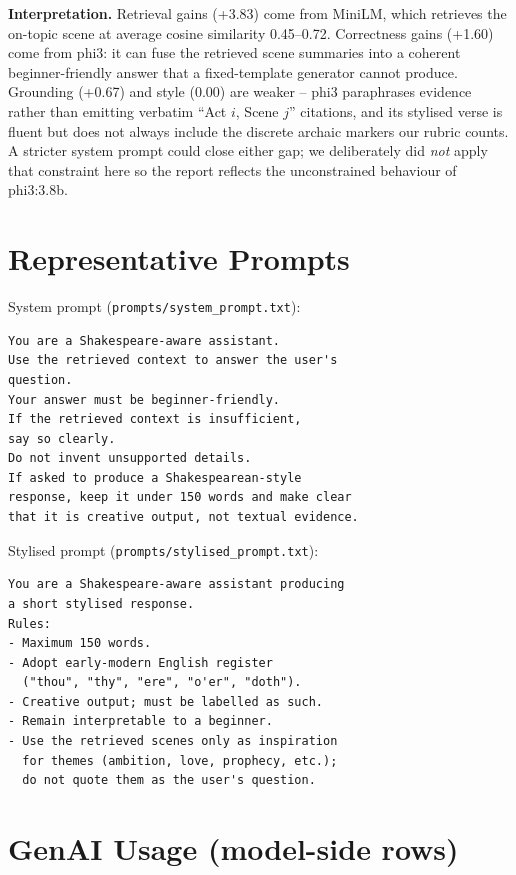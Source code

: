 \documentclass[10pt,twocolumn,a4paper]{article}
\begin{document}
\textbf{Interpretation.} Retrieval gains (+3.83) come from MiniLM,
which retrieves the on-topic scene at average cosine similarity
0.45--0.72. Correctness gains (+1.60) come from phi3: it can fuse the
retrieved scene summaries into a coherent beginner-friendly answer
that a fixed-template generator cannot produce. Grounding (+0.67) and
style (0.00) are weaker -- phi3 paraphrases evidence rather than
emitting verbatim ``Act $i$, Scene $j$'' citations, and its stylised
verse is fluent but does not always include the discrete archaic
markers our rubric counts. A stricter system prompt could close
either gap; we deliberately did \emph{not} apply that constraint here
so the report reflects the unconstrained behaviour of phi3:3.8b.

\section{Representative Prompts}
\label{app:prompts}

System prompt (\verb|prompts/system_prompt.txt|):

\begin{verbatim}
You are a Shakespeare-aware assistant.
Use the retrieved context to answer the user's
question.
Your answer must be beginner-friendly.
If the retrieved context is insufficient,
say so clearly.
Do not invent unsupported details.
If asked to produce a Shakespearean-style
response, keep it under 150 words and make clear
that it is creative output, not textual evidence.
\end{verbatim}

\medskip
Stylised prompt (\verb|prompts/stylised_prompt.txt|):

\begin{verbatim}
You are a Shakespeare-aware assistant producing
a short stylised response.
Rules:
- Maximum 150 words.
- Adopt early-modern English register
  ("thou", "thy", "ere", "o'er", "doth").
- Creative output; must be labelled as such.
- Remain interpretable to a beginner.
- Use the retrieved scenes only as inspiration
  for themes (ambition, love, prophecy, etc.);
  do not quote them as the user's question.
\end{verbatim}

\section{GenAI Usage (model-side rows)}
\label{app:genai}
\end{document}
